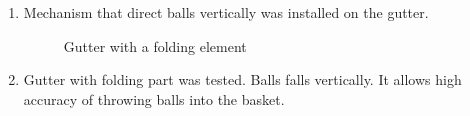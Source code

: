 \begin{enumerate}
\begin{enumerate}
		\item Mechanism that direct balls vertically was installed on the gutter.
		\begin{figure}[H]
			\begin{minipage}[h]{0.47\linewidth}
			\end{minipage}
			\hfill
			\begin{minipage}[h]{0.47\linewidth}
			\end{minipage}
			\caption{Gutter with a folding element}
		\end{figure}
		
        \item Gutter with folding part was tested. Balls falls vertically. It allows high accuracy of throwing balls into the basket. 
		

\end{enumerate}
\end{enumerate}
